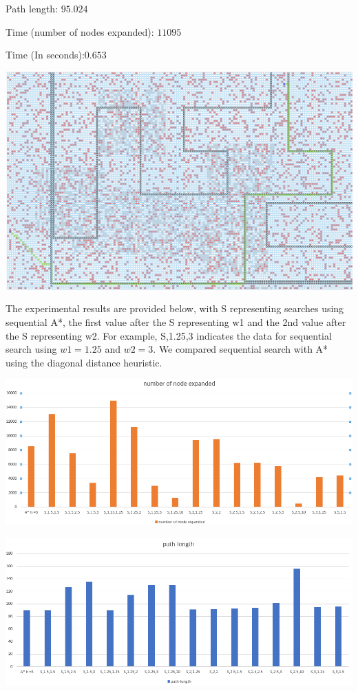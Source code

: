 \documentclass[12pt, letterpaper]{article}
\begin{document}
Path length: $ 95.024 $

Time (number of nodes expanded): $ 11095 $

Time (In seconds):$ 0.653 $

\medskip

\noindent \includegraphics[scale=0.2]{"g-sns-map3-1"}

\medskip

The experimental results are provided below, with S representing searches using sequential A*, the first value after the S representing w1 and the 2nd value after the S representing w2. For example, S,1.25,3 indicates the data for sequential search using $w1 = 1.25$ and $w2 = 3$. We compared sequential search with A* using the diagonal distance heuristic.

\noindent \includegraphics[scale=0.75]{"s-nodeexpanded"}

\medskip

\noindent \includegraphics[scale=0.75]{"s-pathlength"}
\end{document}
